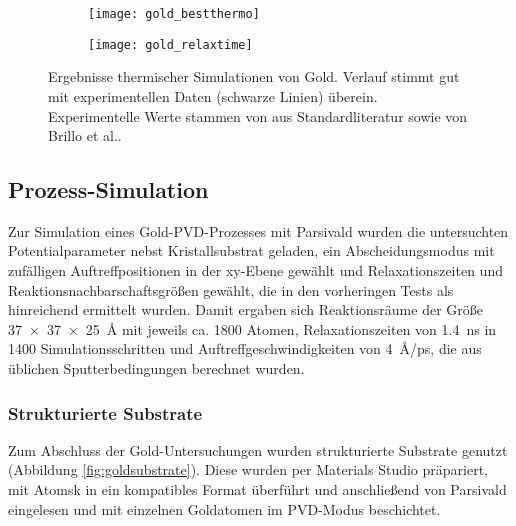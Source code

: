 \begin{figure}[tbp]
  \centering
  \captionsetup[subfigure]{singlelinecheck=false}
  \def\subfigwidth{7cm}
  \begin{subfigure}[t]{\subfigwidth}
    \texttt{[image: gold\_bestthermo]}
  \end{subfigure}
  \hfill
  \begin{subfigure}[t]{\subfigwidth}
    \texttt{[image: gold\_relaxtime]}
  \end{subfigure}
  \caption[Ergebnisse thermischer Simulationen von Gold]{Ergebnisse thermischer Simulationen von Gold.
    Verlauf stimmt gut mit experimentellen Daten (schwarze Linien) überein.
    Experimentelle Werte stammen von aus Standardliteratur sowie von Brillo et al.\cite{brillo_density_2006}.
}
  \label{fig:goldthermo}
\end{figure}

\subsection{Prozess-Simulation}

Zur Simulation eines Gold-PVD-Prozesses mit Parsivald wurden die untersuchten Potentialparameter nebst Kristallsubstrat geladen, ein Abscheidungsmodus mit zufälligen Auftreffpositionen in der xy-Ebene gewählt und Relaxationszeiten und Reaktionsnachbarschaftsgrößen gewählt, die in den vorheringen Tests als hinreichend ermittelt wurden.
Damit ergaben sich Reaktionsräume der Größe \SI{37x37x25}{\angstrom} mit jeweils ca. 1800 Atomen, Relaxationszeiten von \SI{1.4}{\nano\second} in \SI{1400}{} Simulationsschritten und Auftreffgeschwindigkeiten von \SI{4}{\angstrom/\pico\second}, die aus üblichen Sputterbedingungen berechnet wurden.

\subsubsection{Strukturierte Substrate}

Zum Abschluss der Gold-Untersuchungen wurden strukturierte Substrate genutzt (Abbildung \ref{fig:goldsubstrate}).
Diese wurden per Materials Studio präpariert, mit Atomsk in ein kompatibles Format überführt und anschließend von Parsivald eingelesen und mit einzelnen Goldatomen im PVD-Modus beschichtet.

